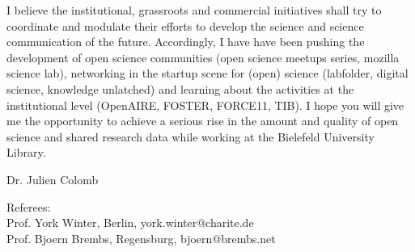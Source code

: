 I believe the institutional, grassroots and commercial initiatives shall try to coordinate and modulate their efforts to develop the science and science communication of the future. Accordingly, I have have been pushing the development of open science communities (open science meetups series, mozilla science lab), networking in the startup scene for (open) science (labfolder, digital science, knowledge unlatched) and learning about the activities at the institutional level (OpenAIRE, FOSTER, FORCE11, TIB). I hope you will give me the opportunity to achieve a serious rise in the amount and quality of open science and shared research data while working at the  Bielefeld University Library.


Dr. Julien Colomb


\vspace {1.cm} 

Referees:
 \\
Prof. York Winter, Berlin, york.winter@charite.de
 \\
Prof. Bjoern Brembs, Regensburg, bjoern@brembs.net
